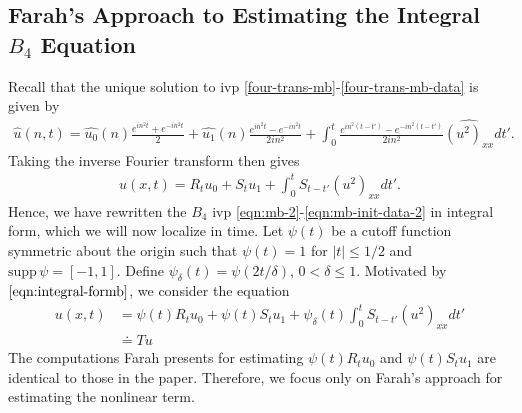 \documentclass[12pt,reqno]{amsart}
\numberwithin{equation}{section}  %
\newcommand{\wh}{\widehat}
\begin{document}
\begin{appendices}
\section{Farah's Approach to Estimating the Integral $B_{4}$ Equation} 
\label{ssec:farah-approach-reduction}
Recall that the unique solution to ivp
\eqref{four-trans-mb}-\eqref{four-trans-mb-data} is given by
%
%
\begin{equation*}
\begin{split}
\wh{u}(n, t) = \wh{u_{0}}(n) \frac{e^{in^{2}t} + e^{-in^{2}t}}{2} +
  \wh{u_{1}}(n)\frac{e^{in^{2}t} - e^{-in^{2}t}}{2 i n^{2}} +
  \int_{0}^{t}\frac{e^{in^{2}(t-t')}-e^{-in^{2}(t-t')}}{2in^{2}}
  \wh{(u^{2})_{xx}} dt'.
\end{split}
\end{equation*}
%
%
Taking the inverse Fourier transform then gives
%
\begin{equation}
  \begin{split}
    u(x,t) = R_{t}u_{0} + S_{t}u_{1} + \int_{0}^{t} S_{t-t'}
    (u^{2})_{xx} dt'.
  \end{split}
  \label{eqn:integral-formb}
\end{equation}
%
%
Hence, we have rewritten the $B_{4}$ ivp
\eqref{eqn:mb-2}-\eqref{eqn:mb-init-data-2} in integral form, which we will now
localize in time. 
Let $\psi(t)$ be a cutoff function symmetric about the 
origin such that $\psi(t) = 1$ for $|t| \le 1/2$ and $\text{supp} \, \psi 
= [-1, 1 ]$. Define $\psi_{\delta}(t) = \psi(2t/\delta)$, $ 0 < \delta \le 1$.
Motivated by $\eqref{eqn:integral-formb}$, we consider the equation
%
%
\begin{equation}
  \begin{split}
    u(x,t)
    & = \psi(t) R_{t} u_{0} + \psi(t) S_{t}u_{1} +
    \psi_{\delta}(t) \int_{0}^{t} S_{t-t'}
    (u^{2})_{xx} dt'
    \\
    & \doteq Tu
  \end{split}
  \label{localized-int-eqn}
\end{equation}
%
%
%
%
%
%
%
The computations Farah presents for estimating
$\psi(t) R_{t}u_{0}$ and $\psi(t) S_{t}u_{1}$ are identical
to those in the paper. Therefore, we focus only on Farah's approach for
estimating the nonlinear
term.

\end{appendices}
\end{document}
